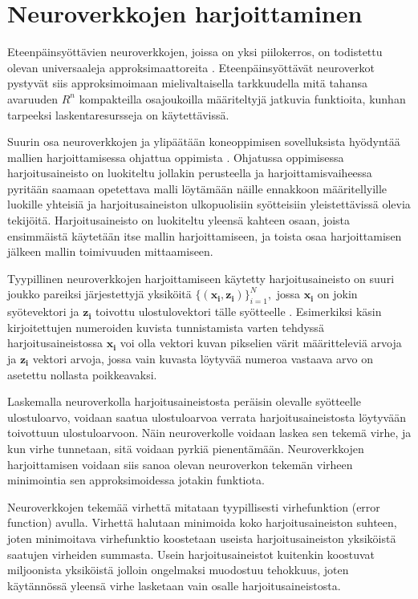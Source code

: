 \documentclass[finnish]{tktltiki2}
\theoremstyle{definition}
\theoremstyle{remark}
\begin{document}
  \section{Neuroverkkojen harjoittaminen}
    \label{chap:neural-training}

  Eteenpäinsyöttävien neuroverkkojen, joissa on yksi piilokerros, on todistettu olevan universaaleja approksimaattoreita \cite{multilayer-feedforward-universal-approximators}. Eteenpäinsyöttävät neuroverkot pystyvät siis approksimoimaan mielivaltaisella tarkkuudella mitä tahansa avaruuden $R^n$ kompakteilla osajoukoilla määriteltyjä jatkuvia funktioita, kunhan tarpeeksi laskentaresursseja on käytettävissä.
  
  Suurin osa neuroverkkojen ja ylipäätään koneoppimisen sovelluksista hyödyntää mallien harjoittamisessa ohjattua oppimista \cite{nature-lecun15}. Ohjatussa oppimisessa harjoitusaineisto on luokiteltu jollakin perusteella ja harjoittamisvaiheessa pyritään saamaan opetettava malli löytämään näille ennakkoon määritellyille luokille yhteisiä ja harjoitusaineiston ulkopuolisiin syötteisiin yleistettävissä olevia tekijöitä. Harjoitusaineisto on luokiteltu yleensä kahteen osaan, joista ensimmäistä käytetään itse mallin harjoittamiseen, ja toista osaa harjoittamisen jälkeen mallin toimivuuden mittaamiseen.
  
  Tyypillinen neuroverkkojen harjoittamiseen käytetty harjoitusaineisto on suuri joukko pareiksi järjestettyjä yksiköitä $ \{(\mathbf{x_i}, \mathbf{z_i})\}_{i=1}^N,$ jossa $\mathbf{x_i}$ on jokin syötevektori ja $\mathbf{z_i}$ toivottu ulostulovektori tälle syötteelle \cite{nature-lecun15}. Esimerkiksi käsin kirjoitettujen numeroiden kuvista tunnistamista varten tehdyssä harjoitusaineistossa $\mathbf{x_i}$ voi olla vektori kuvan pikselien värit määritteleviä arvoja ja $\mathbf{z_i}$ vektori arvoja, jossa vain kuvasta löytyvää numeroa vastaava arvo on asetettu nollasta poikkeavaksi.

  Laskemalla neuroverkolla harjoitusaineistosta peräisin olevalle syötteelle ulostuloarvo, voidaan saatua ulostuloarvoa verrata harjoitusaineistosta löytyvään toivottuun ulostuloarvoon. Näin neuroverkolle voidaan laskea sen tekemä virhe, ja kun virhe tunnetaan, sitä voidaan pyrkiä pienentämään. 
  Neuroverkkojen harjoittamisen voidaan siis sanoa olevan neuroverkon tekemän virheen minimointia sen approksimoidessa jotakin funktiota.
  
  Neuroverkkojen tekemää virhettä mitataan tyypillisesti virhefunktion (error function) avulla. Virhettä halutaan minimoida koko harjoitusaineiston suhteen, joten minimoitava virhefunktio koostetaan useista harjoitusaineiston yksiköistä saatujen virheiden summasta. Usein harjoitusaineistot kuitenkin koostuvat miljoonista yksiköistä jolloin ongelmaksi muodostuu tehokkuus, joten käytännössä yleensä virhe lasketaan vain osalle harjoitusaineistosta.
\end{document}
